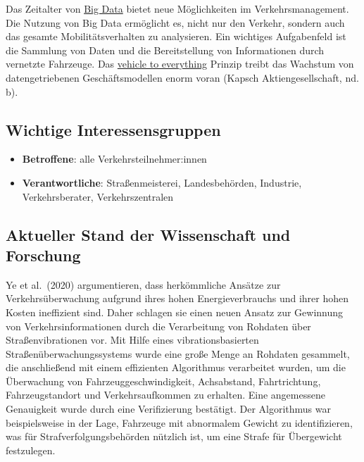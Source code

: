 \documentclass[
]{book}
\providecommand{\tightlist}{%
  \setlength{\itemsep}{0pt}\setlength{\parskip}{0pt}}
\begin{document}
Das Zeitalter von \protect\hyperlink{bd_tool_maping}{Big Data} bietet neue Möglichkeiten im Verkehrsmanagement. Die Nutzung von Big Data ermöglicht es, nicht nur den Verkehr, sondern auch das gesamte Mobilitätsverhalten zu analysieren. Ein wichtiges Aufgabenfeld ist die Sammlung von Daten und die Bereitstellung von Informationen durch vernetzte Fahrzeuge. Das \protect\hyperlink{v2x}{vehicle to everything} Prinzip treibt das Wachstum von datengetriebenen Geschäftsmodellen enorm voran (Kapsch Aktiengesellschaft, nd. b).

\hypertarget{wichtige-interessensgruppen-11}{%
\subsection*{Wichtige Interessensgruppen}\label{wichtige-interessensgruppen-11}}

\begin{itemize}
\tightlist
\item
  \textbf{Betroffene}: alle Verkehrsteilnehmer:innen
\item
  \textbf{Verantwortliche}: Straßenmeisterei, Landesbehörden, Industrie, Verkehrsberater, Verkehrszentralen
\end{itemize}

\hypertarget{aktueller-stand-der-wissenschaft-und-forschung-11}{%
\subsection*{Aktueller Stand der Wissenschaft und Forschung}\label{aktueller-stand-der-wissenschaft-und-forschung-11}}

Ye et al.~(2020) argumentieren, dass herkömmliche Ansätze zur Verkehrsüberwachung aufgrund ihres hohen Energieverbrauchs und ihrer hohen Kosten ineffizient sind. Daher schlagen sie einen neuen Ansatz zur Gewinnung von Verkehrsinformationen durch die Verarbeitung von Rohdaten über Straßenvibrationen vor. Mit Hilfe eines vibrationsbasierten Straßenüberwachungssystems wurde eine große Menge an Rohdaten gesammelt, die anschließend mit einem effizienten Algorithmus verarbeitet wurden, um die Überwachung von Fahrzeuggeschwindigkeit, Achsabstand, Fahrtrichtung, Fahrzeugstandort und Verkehrsaufkommen zu erhalten. Eine angemessene Genauigkeit wurde durch eine Verifizierung bestätigt. Der Algorithmus war beispielsweise in der Lage, Fahrzeuge mit abnormalem Gewicht zu identifizieren, was für Strafverfolgungsbehörden nützlich ist, um eine Strafe für Übergewicht festzulegen.
\end{document}
